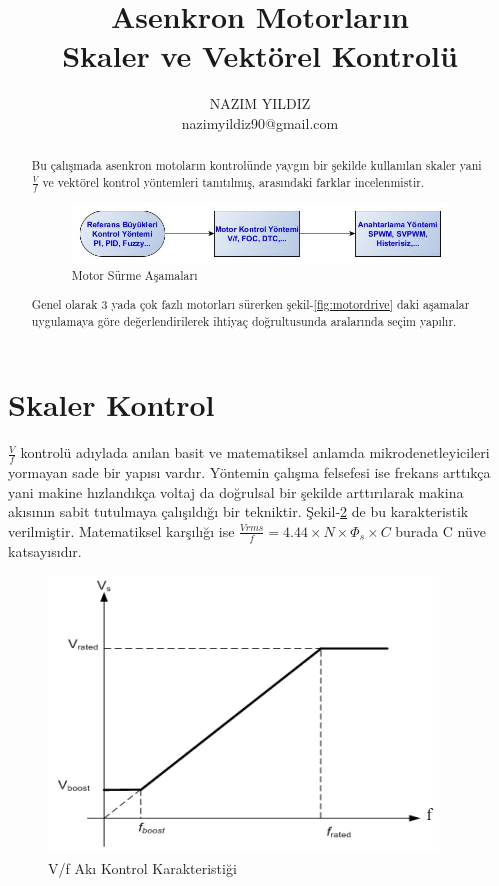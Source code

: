 \documentclass[10pt,a4paper]{article}
\title{Asenkron Motorların \\ 
	\large \vspace*{-10pt} Skaler ve Vektörel Kontrolü\vspace*{10pt}}
\author{%
	NAZIM YILDIZ \\
	nazimyildiz90@gmail.com \\
	\vspace{20pt}
}
\makeatletter
\def\printtitle{%
	{\color{bl} \centering \huge \sc \textbf{\@title}\par}}		%
\def\printauthor{%
	{\centering \small \@author}}				%
\makeatother
\begin{document}
	\printtitle 
	
	\printauthor
	
	\begin{abstract}
		Bu çalışmada asenkron motoların kontrolünde yaygın bir şekilde kullanılan skaler yani 
		$\frac{V}{f}$ ve vektörel kontrol yöntemleri tanıtılmış, arasındaki farklar incelenmistir.
		
			\begin{figure}[hp]
				\centering	
				\shorthandoff{=}
				\includegraphics[width=1.0\linewidth]{MotorKontrolDiyagram.jpg}
				\shorthandon{=}	
				\caption{Motor Sürme Aşamaları}
				\label{fig:motordrive}
			\end{figure}
			
			Genel olarak 3 yada çok fazlı motorları sürerken şekil-\ref{fig:motordrive} daki aşamalar uygulamaya göre değerlendirilerek ihtiyaç doğrultusunda aralarında seçim yapılır.
	\end{abstract}
	
	\section{Skaler Kontrol}
	$\frac{V}{f}$ kontrolü adıylada anılan basit ve matematiksel anlamda mikrodenetleyicileri yormayan sade bir yapısı vardır.
	Yöntemin çalışma felsefesi ise frekans arttıkça yani makine hızlandıkça voltaj da doğrulsal bir şekilde arttırılarak makina akısının sabit tutulmaya çalışıldığı bir tekniktir. Şekil-\ref{fig:vf_kar} de bu karakteristik verilmiştir. Matematiksel karşılığı ise $\frac{Vrms}{f} = 4.44 \times N \times {\Phi_s} \times C$ burada C nüve katsayısıdır.\newline

	\begin{figure}[hp]
		\centering	
		\shorthandoff{=}
		\includegraphics[width=0.7\linewidth]{vf_grafigi.png}
		\shorthandon{=}	
		\caption{V/f Akı Kontrol Karakteristiği}
		\label{fig:vf_kar}
	\end{figure}
	
\end{document}

